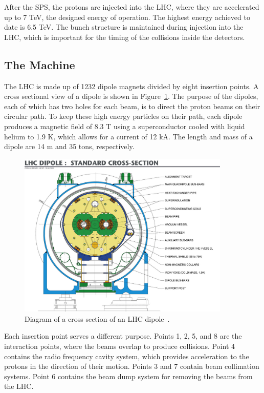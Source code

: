 After the SPS, the protons are injected into the LHC, where they are accelerated up to 7 TeV, the
designed energy of operation. The highest energy achieved to date is 6.5 TeV.
The bunch structure is maintained during injection into the LHC, which is important for the timing
of the collisions inside the detectors. 

\subsection{The Machine\label{subsec:machine}}

The LHC is made up of 1232 dipole magnets divided by eight insertion points. A cross sectional view
of a dipole is shown in Figure~\ref{fig:lhc_dipole}. The purpose of the
dipoles, each of which has two holes for each beam, is to direct the proton beams on their circular
path. To keep these high energy particles on their path, each dipole produces a magnetic field
of 8.3 T using a superconductor cooled with liquid helium to 1.9 K, which allows for a current
of 12 kA. The length and mass of a dipole are 14 m and 35 tons, respectively.

\begin{figure}[ht]
 \begin{center}
    \includegraphics[width=0.90\textwidth]{figures/experiment/9906025_01.jpeg}
      \end{center}
\caption{Diagram of a cross section of an LHC dipole~\cite{Team:40524}.}
\label{fig:lhc_dipole}
\end{figure}

Each insertion point serves a different purpose. Points 1, 2, 5, and 8 are the interaction points, where
the beams overlap to produce collisions. Point 4 contains the radio frequency cavity system, which
provides acceleration to the protons in the direction of their motion. Points 3 and 7 contain beam
collimation systems. Point 6 contains the beam dump system for removing the beams from the LHC.

